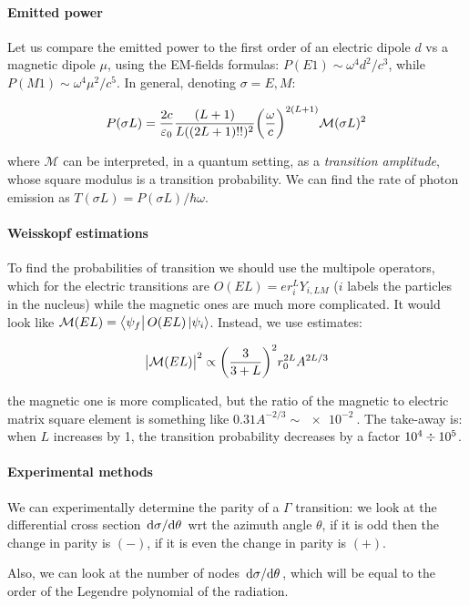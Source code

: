 \documentclass[main.tex]{subfiles}
\begin{document}
\paragraph{Emitted power}

Let us compare the emitted power to the first order of an electric dipole \(d\) vs a magnetic dipole \(\mu\), using the EM-fields formulas: \(P(E1) \sim \omega^4 d^2 / c^3\), while \(P(M1) \sim \omega^4 \mu^2 / c^5\). In general, denoting \(\sigma = E, M\):

\begin{equation}
    P(\sigma L) = \frac{2c}{\varepsilon_0} \frac{(L+1)}{L((2L+1)!!)^2} \qty(\frac{\omega}{c})^{2(L+1)} \mathcal M (\sigma L)^2
\end{equation}

where \(\mathcal M\) can be interpreted, in a quantum setting, as a \emph{transition amplitude}, whose square modulus is a transition probability. We can find the rate of photon emission as \(T(\sigma L) = P(\sigma L) / \hbar \omega\).

\paragraph{Weisskopf estimations}

To find the probabilities of transition we should use the multipole operators, which for the electric transitions are \(O(EL) = e r^L_i Y_{i,LM}\) (\(i\) labels the particles in the nucleus) while the magnetic ones are much more complicated.
It would look like \(\mathcal M (EL) = \bra{\psi_f} O(EL) \ket{\psi_i} \).
Instead, we use estimates:

\begin{equation}
    \abs{\mathcal M (EL)}^2 \propto \qty(\frac{3}{3+L}) ^2 r_0^{2L} A^{2L/3}
\end{equation}

the magnetic one is more complicated, but the ratio of the magnetic to electric matrix square element is something like \(0.31A^{-2/3} \sim \SI{e-2}{} \). The take-away is: when \(L\) increases by 1, the transition probability decreases by a factor \(\SI{e4}{} \divisionsymbol \SI{e5}{} \).

\paragraph{Experimental methods}

We can experimentally determine the parity of a \(\Gamma\) transition: we look at the differential cross section \(\dv*{\sigma}{\theta} \) wrt the azimuth angle \(\theta\), if it is odd then the change in parity is \((-)\), if it is even the change in parity is \((+)\).

Also, we can look at the number of nodes \(\dv*{\sigma}{\theta} \), which will be equal to the order of the Legendre polynomial of the radiation.
\end{document}
